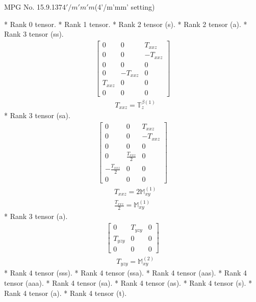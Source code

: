 \documentclass[fleqn,8pt,landscape]{jsarticle}
\begin{document}
\setcounter{MaxMatrixCols}{32}

\renewcommand{\tablename}{Table~}
\renewcommand{\figurename}{Figure~}
\begin{center}
\LARGE
MPG No. 15.9.137\quad$4'/m'm'm$\quad(4'/m'mm' setting)
\end{center}
* Rank 0 tensor.
* Rank 1 tensor.
* Rank 2 tensor (s).
* Rank 2 tensor (a).
* Rank 3 tensor (ss).
\begin{align*}
\begin{bmatrix} 0 & 0 & T_{xxz} \\ 0 & 0 & - T_{xxz} \\ 0 & 0 & 0 \\ 0 & - T_{xxz} & 0 \\ T_{xxz} & 0 & 0 \\ 0 & 0 & 0 \end{bmatrix}
\end{align*}
\begin{align*}
& T_{xxz} = \mathbb{T}_{z}^{\beta(1)}
\end{align*}
* Rank 3 tensor (sa).
\begin{align*}
\begin{bmatrix} 0 & 0 & T_{xxz} \\ 0 & 0 & - T_{xxz} \\ 0 & 0 & 0 \\ 0 & \frac{T_{xxz}}{2} & 0 \\ - \frac{T_{xxz}}{2} & 0 & 0 \\ 0 & 0 & 0 \end{bmatrix}
\end{align*}
\begin{align*}
& T_{xxz} = 2 \mathbb{M}_{xy}^{(1)} \\
& \frac{T_{xxz}}{2} = \mathbb{M}_{xy}^{(1)}
\end{align*}
* Rank 3 tensor (a).
\begin{align*}
\begin{bmatrix} 0 & T_{yzy} & 0 \\ T_{yzy} & 0 & 0 \\ 0 & 0 & 0 \end{bmatrix}
\end{align*}
\begin{align*}
& T_{yzy} = \mathbb{M}_{xy}^{(2)}
\end{align*}
* Rank 4 tensor (sss).
* Rank 4 tensor (ssa).
* Rank 4 tensor (aas).
* Rank 4 tensor (aaa).
* Rank 4 tensor (sa).
* Rank 4 tensor (as).
* Rank 4 tensor (s).
* Rank 4 tensor (a).
* Rank 4 tensor (t).
\end{document}
